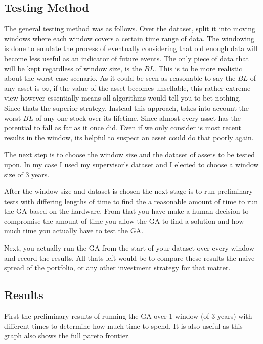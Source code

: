 \documentclass[11pt]{article}
\begin{document}
\subsection{Testing Method}

    The general testing method was as follows. Over the dataset, split it into moving windows
    where each window covers a certain time range of data. The windowing is done to emulate
    the process of eventually considering that old enough data will become less useful
    as an indicator of future events. The only piece of data that will be kept regardless
    of window size, is the \(BL\). This is to be more realistic about the worst case scenario.
    As it could be seen as reasonable to say the \(BL\) of any asset is \(\infty\), if the value
    of the asset becomes unsellable, this rather extreme view however essentially means all
    algorithms would tell you to bet nothing. Since thats the superior strategy. Instead
    this approach, takes into account the worst \(BL\) of any one stock over its lifetime.
    Since almost every asset has the potential to fall as far as it once did. Even if we only
    consider is most recent results in the window, its helpful to suspect an asset could
    do that poorly again.

    The next step is to choose the window size and the dataset of assets to be tested upon.
    In my case I used my supervisor's dataset \cite{Dataset} and I elected to choose a window
    size of 3 years.

    After the window size and dataset is chosen the next stage is to run preliminary tests with
    differing lengths of time to find the a reasonable amount of time to run the GA based on
    the hardware. From that you have make a human decision to compromise the amount of time
    you allow the GA to find a solution and how much time you actually have to test the GA.

    Next, you actually run the GA from the start of your dataset over every window and record
    the results. All thats left would be to compare these results the naive spread of the
    portfolio, or any other investment strategy for that matter.

\subsection{Results}

    First the preliminary results of running the GA over 1 window (of 3 years) with different
    times to determine how much time to spend. It is also useful as this graph also shows
    the full pareto frontier.
\end{document}
